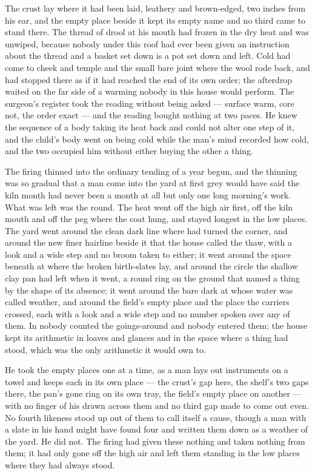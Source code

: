 The crust lay where it had been laid, leathery and brown-edged, two inches from his ear, and the empty place beside it kept its empty name and no third came to stand there. The thread of drool at his mouth had frozen in the dry heat and was unwiped, because nobody under this roof had ever been given an instruction about the thread and a basket set down is a pot set down and left. Cold had come to cheek and temple and the small bare joint where the wool rode back, and had stopped there as if it had reached the end of its own order; the afterdrop waited on the far side of a warming nobody in this house would perform. The surgeon's register took the reading without being asked --- surface warm, core not, the order exact --- and the reading bought nothing at two paces. He knew the sequence of a body taking its heat back and could not alter one step of it, and the child's body went on being cold while the man's mind recorded how cold, and the two occupied him without either buying the other a thing.

\scenebreak

The firing thinned into the ordinary tending of a year begun, and the thinning was so gradual that a man come into the yard at first grey would have said the kiln month had never been a month at all but only one long morning's work. What was left was the round. The heat went off the high air first, off the kiln mouth and off the peg where the coat hung, and stayed longest in the low places. The yard went around the clean dark line where  had turned the corner, and around the new finer hairline beside it that the house called the thaw, with a look and a wide step and no broom taken to either; it went around the space beneath  at  where the broken birth-slates lay, and around the circle the shallow clay pan had left when it went, a round ring on the ground that named a thing by the shape of its absence; it went around the bare dark  at  whose water was called weather, and around the field's empty place and the place the carriers crossed, each with a look and a wide step and no number spoken over any of them. In  nobody counted the goings-around and nobody entered them; the house kept its arithmetic in loaves and glances and in the space where a thing had stood, which was the only arithmetic it would own to.

He took the empty places one at a time, as a man lays out instruments on a towel and keeps each in its own place --- the crust's gap here, the shelf's two gaps there, the pan's gone ring on its own tray, the field's empty place on another --- with no finger of his drawn across them and no third gap made to come out even. No fourth likeness stood up out of them to call itself a cause, though a man with a slate in his hand might have found four and written them down as a weather of the yard. He did not. The firing had given these nothing and taken nothing from them; it had only gone off the high air and left them standing in the low places where they had always stood.

